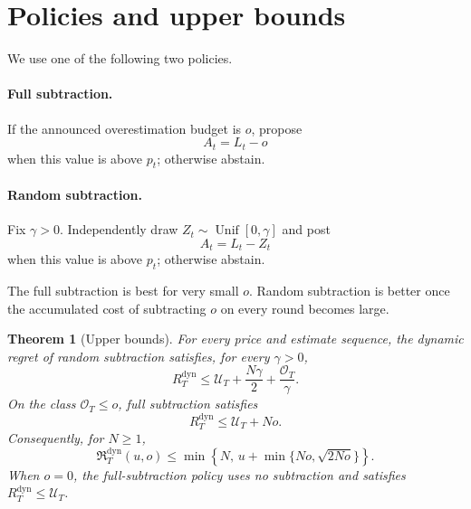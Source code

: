 \documentclass[11pt]{article}
\newtheorem{theorem}{Theorem}
\theoremstyle{remark}
\newcommand{\cU}{\mathcal U}
\newcommand{\cO}{\mathcal O}
\newcommand{\Rstar}{\mathfrak R}
\DeclareMathOperator{\Unif}{Unif}
\begin{document}
\section{Policies and upper bounds}

We use one of the following two policies.

\paragraph{Full subtraction.}
If the announced overestimation budget is $o$, propose
\begin{equation}\label{eq:full-subtraction}
  A_t=L_t-o
\end{equation}
when this value is above $p_t$; otherwise abstain.

\paragraph{Random subtraction.}
Fix $\gamma>0$.  Independently draw
$Z_t\sim\Unif[0,\gamma]$ and post
\begin{equation}\label{eq:random-subtraction}
  A_t=L_t-Z_t
\end{equation}
when this value is above $p_t$; otherwise abstain.

The full subtraction is best for very small $o$.  Random subtraction is
better once the accumulated cost of subtracting $o$ on every round becomes
large.

\begin{theorem}[Upper bounds]\label{thm:upper}
For every price and estimate sequence, the dynamic regret of random
subtraction satisfies, for every $\gamma>0$,
\begin{equation}\label{eq:random-upper}
  R_T^{\mathrm{dyn}}
  \le
  \cU_T+\frac{N\gamma}{2}+\frac{\cO_T}{\gamma}.
\end{equation}
On the class $\cO_T\le o$, full subtraction satisfies
\begin{equation}\label{eq:full-upper}
  R_T^{\mathrm{dyn}}\le \cU_T+No.
\end{equation}
Consequently, for $N\ge1$,
\begin{equation}\label{eq:minimax-upper}
  \Rstar_T^{\mathrm{dyn}}(u,o)
  \le
  \min\left\{
    N,\,
    u+\min\bigl\{No,\sqrt{2No}\bigr\}
  \right\}.
\end{equation}
When $o=0$, the full-subtraction policy uses no subtraction and satisfies
$R_T^{\mathrm{dyn}}\le\cU_T$.
\end{theorem}
\end{document}
